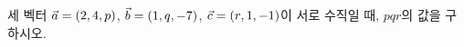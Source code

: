 세 벡터 $\vec{a}=(2{,}\mkern3mu\mathopen{}4{,}\mkern3mu\mathopen{}p)$, $\vec{b}=(1{,}\mkern3mu\mathopen{}q{,}\mkern3mu\mathopen{}-7)$, $\vec{c}=(r{,}\mkern3mu\mathopen{}1{,}\mkern3mu\mathopen{}-1)$이 서로 수직일 때, $pqr$의 값을 구하시오.
